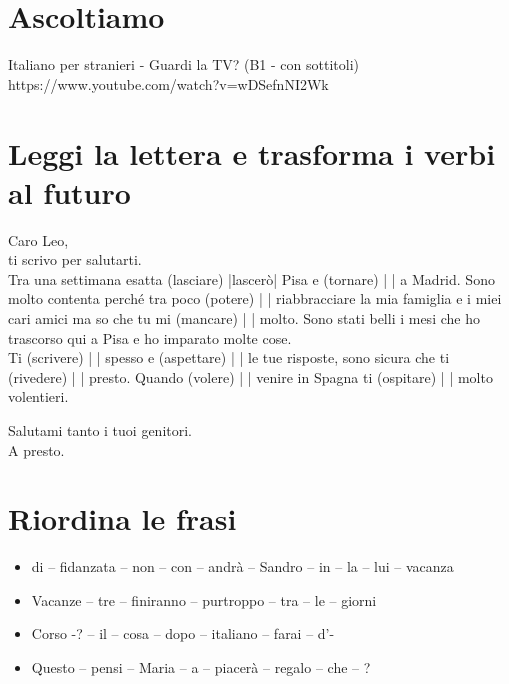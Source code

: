 \documentclass[letter,11pt]{article}
\begin{document}
\vskip 0.2in
\section*{Ascoltiamo}


\noindent Italiano per stranieri - Guardi la TV? (B1 - con sottitoli)\\
https://www.youtube.com/watch?v=wDSefnNI2Wk \\


\vskip 0.2in
\section*{Leggi la lettera e trasforma i verbi al futuro}
\vskip 0.2in

Caro Leo,\\

\noindent ti scrivo per salutarti.\\

\noindent Tra una settimana esatta (lasciare) |lascerò| Pisa e (tornare) |  | a Madrid. Sono molto contenta perché tra poco (potere) |  | riabbracciare la mia famiglia e i miei cari amici ma so che tu mi (mancare) |  | molto. Sono stati belli i mesi che ho trascorso qui a Pisa e ho imparato molte cose.\\
Ti (scrivere) |  | spesso e (aspettare) |  | le tue risposte, sono sicura che ti (rivedere) |  | presto. Quando (volere) |  | venire in Spagna ti (ospitare) |  | molto volentieri.

\noindent Salutami tanto i tuoi genitori.\\

\noindent A presto.\\


\vskip 0.2in
\section*{Riordina le frasi}

\begin{itemize}
    \item di – fidanzata – non – con – andrà – Sandro – in – la – lui – vacanza
    \item Vacanze – tre – finiranno – purtroppo – tra – le – giorni
    \item Corso -? – il – cosa – dopo – italiano – farai – d’-
    \item Questo – pensi – Maria – a – piacerà – regalo – che – ?


\end{itemize}
\end{document}
